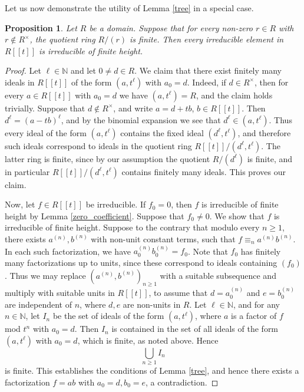 \documentclass{article}
\newcommand{\N}{\mathbb{N}}
\theoremstyle{plain}
\newtheorem{proposition}[theorem]{Proposition}
\theoremstyle{definition}
\theoremstyle{remark}
\theoremstyle{plain}
\begin{document}
Let us now demonstrate the utility of Lemma \ref{tree} in a special case. 

\begin{proposition}\label{finite_quotient}
    Let $R$ be a domain. Suppose that for every non-zero $r \in R$ with $r \notin R^\times$, the quotient ring $R/(r)$ is finite. Then every irreducible element in $R[[t]]$ is irreducible of finite height. 
\end{proposition}
\begin{proof}
Let $\ell \in \N$ and let $0 \neq d \in R$. We claim that there exist finitely many ideals in $R[[t]]$ of the form $(a,t^\ell)$ with $a_0 = d$.  Indeed, if $d \in R^\times$, then for every $a \in R[[t]]$ with $a_0 = d$ we have $(a,t^\ell) = R$, and the claim holds trivially. Suppose that $d \notin R^\times$, and write $a = d+tb$, $b \in R[[t]]$. Then $d^\ell = (a-tb)^\ell$, and by the binomial expansion we see that $d^\ell \in (a,t^\ell)$. Thus every ideal of the form $(a,t^\ell)$ contains the fixed ideal $(d^\ell,t^\ell)$, and therefore such ideals correspond to ideals in the quotient ring $R[[t]]/(d^\ell,t^\ell)$.  The latter ring is finite, since by our assumption the quotient $R/(d^\ell)$ is finite, and in particular $R[[t]]/(d^\ell,t^\ell)$ contains finitely many ideals. This proves our claim. 

Now, let $f \in R[[t]]$ be irreducible. If $f_0 = 0$, then $f$ is irreducible of finite height by Lemma \ref{zero_coefficient}. Suppose that $f_0 \neq 0$. We show that $f$ is irreducible of finite height. Suppose to the contrary that modulo every $n \geq 1$, there exists $a^{(n)},b^{(n)}$ with non-unit constant terms, such that $f \equiv_n a^{(n)}b^{(n)}$. In each such factorization, we have $a^{(n)}_0b^{(n)}_0 = f_0$. Note that $f_0$ has finitely many factorizations up to units, since these correspond to ideals containing $(f_0)$. Thus
we may replace $(a^{(n)},b^{(n)})_{n \geq 1}$ with a suitable subsequence and multiply with suitable units in $R[[t]]$, to assume that $d = a^{(n)}_0$ and $e = b^{(n)}_0$ are independent of $n$, where $d,e$ are non-units in $R$. Let $\ell \in \N$, and for any $n \in \N$, let $I_n$ be the set of ideals of the form $(a,t^\ell)$, where $a$ is a factor of $f$ mod $t^n$ with $a_0 = d$. Then $I_n$ is contained in the set of all ideals of the form $(a,t^\ell)$ with $a_0 = d$, which is finite, as noted above. Hence $$\bigcup_{n \geq 1}I_n$$
is finite. This establishes the conditions of Lemma \ref{tree}, and hence there exists a factorization $f = ab$ with $a_0 = d,b_0= e$, a contradiction.

\end{proof}
\end{document}
